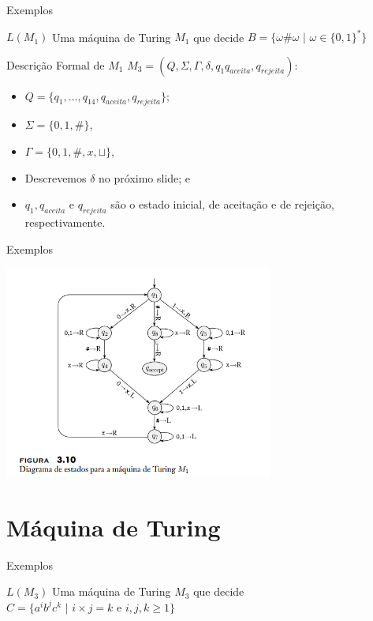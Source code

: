 \documentclass[xcolor=dvipsnames,table]{beamer}
\begin{document}
    \begin{frame}{Exemplos}
		\begin{block}{$L(M_1)$}
		Uma máquina de Turing $M_1$ que decide $B = \{ \omega \# \omega \mbox{ | } \omega \in \{ 0, 1 \}^* \}$		
		\end{block} 
		\begin{block}{Descrição Formal de $M_1$}
			$M_3 = (Q, \Sigma, \Gamma, \delta, q_1 q_{aceita}, q_{rejeita})$:
			\begin{itemize}
				\item $Q = \{ q_1, \ldots, q_{14}, q_{aceita}, q_{rejeita} \}$;
				\item $\Sigma = \{ 0, 1, \# \}$,
				\item $\Gamma = \{ 0, 1, \#, x, \sqcup \}$,
				\item Descrevemos $\delta$ no próximo slide; e
				\item $q_1, q_{aceita}$ e $q_{rejeita}$ são o estado inicial, de aceitação e de rejeição, respectivamente.
			\end{itemize}
		\end{block}
	\end{frame}
	
	\begin{frame}{Exemplos}
	\begin{center}
			\includegraphics[height=7cm]{images/fig310.png}
		\end{center}
	\end{frame}	
    
    \section{Máquina de Turing}	
	\begin{frame}{Exemplos}
		\begin{block}{$L(M_3)$}
		Uma máquina de Turing $M_3$ que decide $C = \{ a^i b^j c^k \mbox{ | } i \times j = k \mbox{ e } i,j,k \geq 1 \}$		
		\end{block}
	\end{frame}
	
\end{document}
